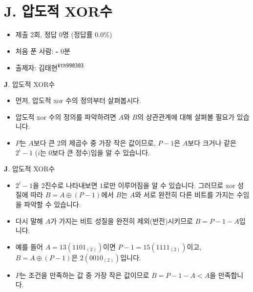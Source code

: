 \section{J. 압도적 XOR수}

\begin{frame} %
    \begin{itemize}
    	\item 제출 2회, 정답 0명 (정답률 0.0\%)
    	\item 처음 푼 사람: \textbf{-} 0분
        \item 출제자: 김태현\textsuperscript{\color{kupc-gray}\texttt{kth990303}}
    \end{itemize}
\end{frame}

\begin{frame}{\textbf{J}. 압도적 XOR수}
    \begin{itemize}
        \item 먼저, 압도적 xor 수의 정의부터 살펴봅시다.
        \item 압도적 xor 수의 정의를 파악하려면 $A$와 $B$의 상관관계에 대해 살펴볼 필요가 있습니다.
        \item $P$는 $A$보다 큰 2의 제곱수 중 가장 작은 값이므로, $P-1$은 $A$보다 크거나 같은 $2^i-1$ ($i$는 0보다 큰 정수)임을 알 수 있습니다.
    \end{itemize}
\end{frame}

\begin{frame}{\textbf{J}. 압도적 XOR수}
	\begin{itemize}
		\item $2^i-1$을 2진수로 나타내보면 $1$로만 이루어짐을 알 수 있습니다. 그러므로 xor 성질에 따라 $B = A \oplus (P-1)$에서 $B$는 $A$와 서로 완전히 다른 비트를 가지는 수임을 파악할 수 있습니다. 
		\item 다시 말해 $A$가 가지는 비트 성질을 완전히 제외(반전)시키므로 $B = P - 1 - A$입니다.
		\item 예를 들어 $A = 13 (1101_{(2)})$이면 $P-1 = 15 (1111_{(2)})$이고, $B = A \oplus (P-1)$은 $2 (0010_{(2)})$입니다. 
		\item $P$는 조건을 만족하는 값 중 가장 작은 값이므로 $B = P - 1 - A < A$을 만족합니다.
	\end{itemize}
\end{frame}


